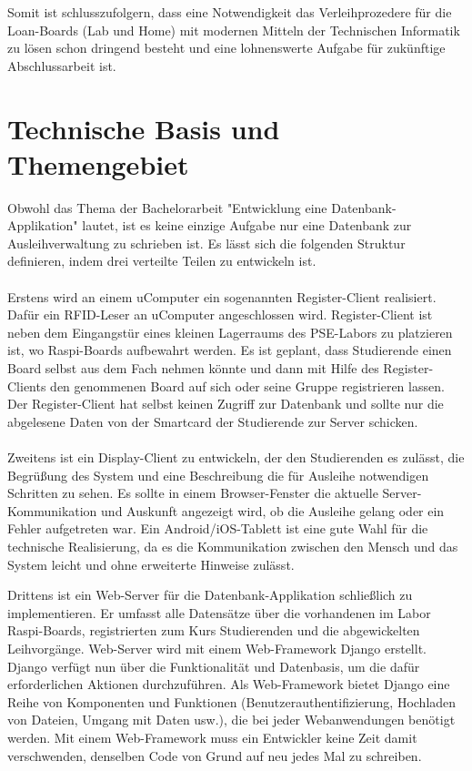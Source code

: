 Somit ist schlusszufolgern, dass eine Notwendigkeit das Verleihprozedere für die Loan-Boards (Lab und Home) mit modernen Mitteln der Technischen Informatik zu lösen schon dringend besteht und eine lohnenswerte Aufgabe für zukünftige Abschlussarbeit ist. 

\section{Technische Basis und Themengebiet}
\label{sec:intro:themengebiet}
Obwohl das Thema der Bachelorarbeit "Entwicklung eine Datenbank-Applikation" lautet, ist es keine einzige Aufgabe nur eine Datenbank zur Ausleihverwaltung zu schrieben ist. Es lässt sich die folgenden Struktur definieren, indem drei verteilte Teilen zu entwickeln ist.\\\\
Erstens wird an einem uComputer ein sogenannten Register-Client realisiert. Dafür ein RFID-Leser an uComputer angeschlossen wird. Register-Client ist neben dem Eingangstür eines kleinen Lagerraums des PSE-Labors zu platzieren ist, wo Raspi-Boards aufbewahrt werden. Es ist geplant, dass Studierende einen Board selbst aus dem Fach nehmen könnte und dann mit Hilfe des Register-Clients den genommenen Board auf sich oder seine Gruppe registrieren lassen. Der Register-Client hat selbst keinen Zugriff zur Datenbank und sollte nur die abgelesene Daten von der Smartcard der Studierende zur Server schicken. \\\\
Zweitens ist ein Display-Client zu entwickeln, der den Studierenden es zulässt, die Begrüßung des System und eine Beschreibung die für Ausleihe notwendigen Schritten zu sehen. Es sollte in einem Browser-Fenster die aktuelle Server-Kommunikation und Auskunft angezeigt wird, ob die Ausleihe gelang oder ein Fehler aufgetreten war. Ein Android/iOS-Tablett ist eine gute Wahl für die technische Realisierung, da es die Kommunikation zwischen den Mensch und das System leicht und ohne erweiterte Hinweise zulässt. 

Drittens ist ein Web-Server für die Datenbank-Applikation schließlich zu implementieren. Er umfasst alle Datensätze über die vorhandenen im Labor Raspi-Boards, registrierten zum Kurs Studierenden und die abgewickelten Leihvorgänge.  Web-Server wird mit einem Web-Framework Django erstellt.  Django verfügt nun über die Funktionalität und Datenbasis, um die dafür erforderlichen Aktionen durchzuführen. Als Web-Framework bietet Django eine Reihe von Komponenten und Funktionen (Benutzerauthentifizierung, Hochladen von Dateien, Umgang mit Daten usw.), die bei jeder Webanwendungen benötigt werden. Mit einem Web-Framework muss ein Entwickler keine Zeit damit verschwenden, denselben Code von Grund auf neu jedes Mal zu schreiben.

